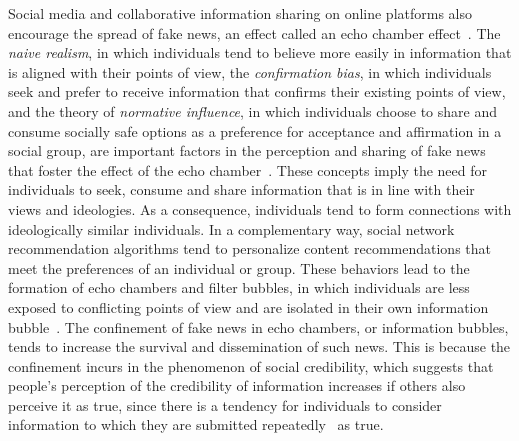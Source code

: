 \documentclass{ieeeaccess}
\begin{document}
Social media and collaborative information sharing on online platforms also encourage the spread of fake news, an effect called an echo chamber effect~\cite{shu2020fakenewsnet}. The \textit{naive realism}, in which individuals tend to believe more easily in information that is aligned with their points of view, the \textit{confirmation bias}, in which individuals seek and prefer to receive information that confirms their existing points of view, and the theory of \textit{normative influence}, in which individuals choose to share and consume socially safe options as a preference for acceptance and affirmation in a social group, are important factors in the perception and sharing of fake news that foster the effect of the echo chamber~\cite{shu2020fakenewsnet}. These concepts imply the need for individuals to seek, consume and share information that is in line with their views and ideologies. As a consequence, individuals tend to form connections with ideologically similar individuals. In a complementary way, social network recommendation algorithms tend to personalize content recommendations that meet the preferences of an individual or group. These behaviors lead to the formation of echo chambers and filter bubbles, in which individuals are less exposed to conflicting points of view and are isolated in their own information bubble~\cite{fuller2009, sharma2019combating}. The confinement of fake news in echo chambers, or information bubbles, tends to increase the survival and dissemination of such news. This is because the confinement incurs in the phenomenon of social credibility, which suggests that people's perception of the credibility of information increases if others also perceive it as true, since there is a tendency for individuals to consider information to which they are submitted repeatedly~\cite{rubin2016fake} as true.
\end{document}
